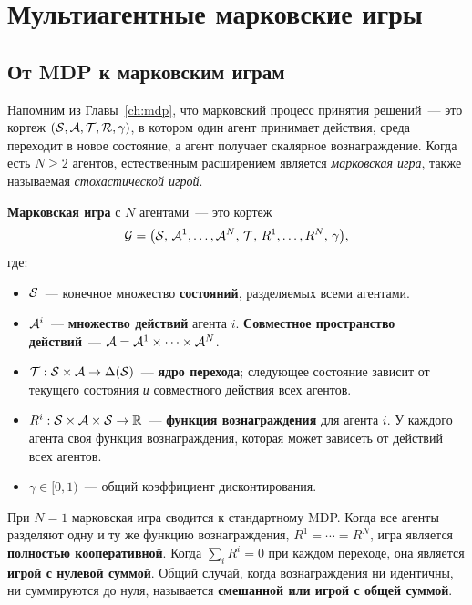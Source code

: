 \section{Мультиагентные марковские игры}
\label{sec:markov-games}

\subsection{От MDP к марковским играм}

Напомним из Главы~\ref{ch:mdp}, что марковский процесс принятия решений~--- это
кортеж $(\mathcal{S}, \mathcal{A}, \mathcal{T}, \mathcal{R}, \gamma)$, в котором один агент принимает
действия, среда переходит в новое состояние, а агент
получает скалярное вознаграждение. Когда есть $N \geq 2$ агентов,
естественным расширением является \emph{марковская игра},
также называемая \emph{стохастической игрой}.

\begin{definition}
\label{def:markov-game}
\textbf{Марковская игра} с $N$ агентами~--- это кортеж
\[
  \mathcal{G} = \bigl(\mathcal{S},\, \mathcal{A}^1, \ldots, \mathcal{A}^N,\, \mathcal{T},\,
                       R^1, \ldots, R^N,\, \gamma\bigr),
\]
где:
\begin{itemize}[leftmargin=*]
  \item $\mathcal{S}$~--- конечное множество \textbf{состояний}, разделяемых всеми агентами.
  \item $\mathcal{A}^i$~--- \textbf{множество действий} агента $i$. \textbf{Совместное пространство действий}~--- $\mathcal{A} = \mathcal{A}^1 \times \cdots \times \mathcal{A}^N$.
  \item $\mathcal{T} : \mathcal{S} \times \mathcal{A} \to \Delta(\mathcal{S})$~--- \textbf{ядро перехода}; следующее состояние зависит от текущего
    состояния \emph{и} совместного действия всех агентов.
  \item $R^i : \mathcal{S} \times \mathcal{A} \times \mathcal{S} \to \mathbb{R}$~--- \textbf{функция вознаграждения} для агента $i$. У каждого агента своя
    функция вознаграждения, которая может зависеть от действий всех агентов.
  \item $\gamma \in [0,1)$~--- общий коэффициент дисконтирования.
\end{itemize}
\end{definition}

При $N = 1$ марковская игра сводится к стандартному MDP. Когда все
агенты разделяют одну и ту же функцию вознаграждения, $R^1 = \cdots = R^N$, игра
является \textbf{полностью кооперативной}. Когда
$\sum_i R^i = 0$ при каждом переходе, она является \textbf{игрой с нулевой суммой}.
Общий случай, когда вознаграждения ни идентичны, ни суммируются до
нуля, называется \textbf{смешанной или игрой с общей суммой}.

